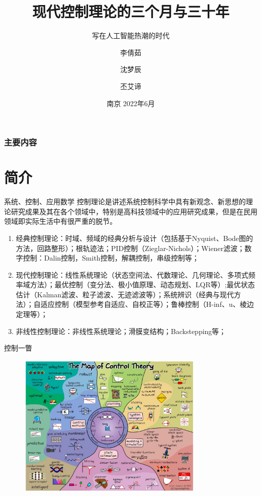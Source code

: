 \documentclass[10pt]{ctexbeamer}
\title[南京邮电大学]{现代控制理论的三个月与三十年}
\subtitle{写在人工智能热潮的时代}
\author[李倩茹]{李倩茹 \and 沈梦辰  \and 丕艾谛}
\institute[自动化学院、人工智能学院]{南京邮电大学

自动化学院、人工智能学院}
\date[南京 2022年6月]
{南京 2022年6月}
\begin{document}
\frame{\titlepage}
\begin{frame}
\frametitle{主要内容}
\tableofcontents
\end{frame}

\section{简介}

\begin{frame}{系统、控制、应用数学}
  控制理论是讲述系统控制科学中具有新观念、新思想的理论研究成果及其在各个领域中，特别是高科技领域中的应用研究成果，但是在民用领域即实际生活中有很严重的脱节。
\end{frame}

\begin{frame}{}
  \begin{enumerate}
    \item 经典控制理论：时域、频域的经典分析与设计（包括基于Nyquist、Bode图的方法，回路整形）；根轨迹法；PID控制（Zieglar-Nichols）；Wiener滤波；数字控制：Dalin控制，Smith控制，解耦控制，串级控制等；
    \item 现代控制理论：线性系统理论（状态空间法、代数理论、几何理论、多项式频率域方法）；最优控制（变分法、极小值原理、动态规划、LQR等）;最优状态估计（Kalman滤波、粒子滤波、无迹滤波等）；系统辨识（经典与现代方法）；自适应控制（模型参考自适应、自校正等）；鲁棒控制（H-inf、u、棱边定理等）；
    \item 非线性控制理论：非线性系统理论；滑膜变结构；Backstepping等；
  \end{enumerate}
\end{frame}

\begin{frame}{控制一瞥}
  \begin{figure}
    \includegraphics[width=0.8\textwidth]{pic/map_of_control.jpeg}
  \end{figure}
\end{frame}
\end{document}
